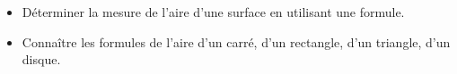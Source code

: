 \begin{prerequis}
    \begin{itemize}        
        \item[\emoji{diamond-suit}] Déterminer la mesure de l’aire d’une surface en utilisant une formule.        
        \item[\emoji{red-heart}] Connaître les formules de l’aire d’un carré, d’un rectangle, d’un triangle, d’un disque.
    \end{itemize}
\end{prerequis}
